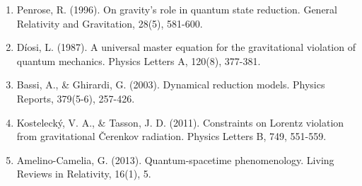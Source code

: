 \documentclass[11pt]{article}
\begin{document}
\begin{enumerate}
\item Penrose, R. (1996). On gravity's role in quantum state reduction. General Relativity and Gravitation, 28(5), 581-600.
\item Díosi, L. (1987). A universal master equation for the gravitational violation of quantum mechanics. Physics Letters A, 120(8), 377-381.
\item Bassi, A., \& Ghirardi, G. (2003). Dynamical reduction models. Physics Reports, 379(5-6), 257-426.
\item Kostelecký, V. A., \& Tasson, J. D. (2011). Constraints on Lorentz violation from gravitational Čerenkov radiation. Physics Letters B, 749, 551-559.
\item Amelino-Camelia, G. (2013). Quantum-spacetime phenomenology. Living Reviews in Relativity, 16(1), 5.
\end{enumerate}
\end{document}
